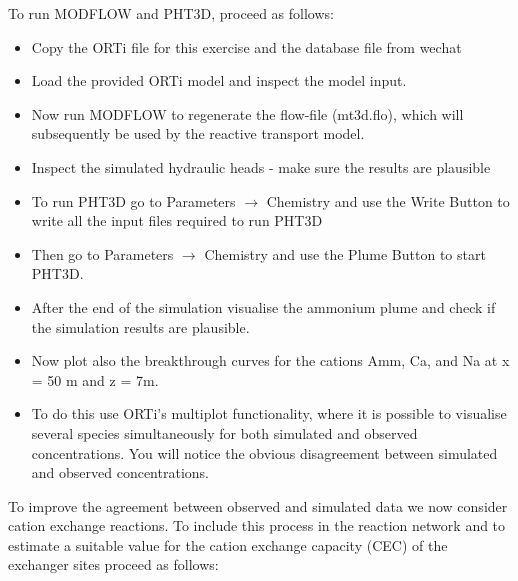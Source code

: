 
To run MODFLOW and PHT3D, proceed as follows:

\begin{itemize}

\item Copy the ORTi file for this exercise and the database file from {\color{blue}wechat}    

\item Load the provided ORTi model and inspect the model input.

\item Now run MODFLOW to regenerate the flow-file (mt3d.flo), which will subsequently be used 
by the reactive transport model.

\item Inspect the simulated hydraulic heads - make sure the results are plausible

\item To run PHT3D go to {\color{blue}Parameters} $\rightarrow$ {\color{blue} Chemistry} and use 
the {\color{blue}Write Button} to write all the input files required to run PHT3D

\item Then go to {\color{blue}Parameters} $\rightarrow$ {\color{blue}Chemistry} and use the {\color{blue}Plume Button} to start PHT3D.

\item After the end of the simulation visualise the ammonium plume and check if the 
simulation results are plausible. 

\item Now plot also the breakthrough curves for the cations Amm, Ca, and Na at x = 50 m
and z = 7m. 

\item To do this use ORTi's multiplot functionality, where it is possible to visualise several species simultaneously for both simulated and observed concentrations. You will notice the obvious disagreement between simulated and observed concentrations. 


\end{itemize}

To improve the agreement between observed and simulated data we now consider cation exchange reactions. 
To include this process in the reaction network and to estimate
a suitable value for the cation exchange capacity (CEC) of the exchanger sites 
proceed as follows: 

